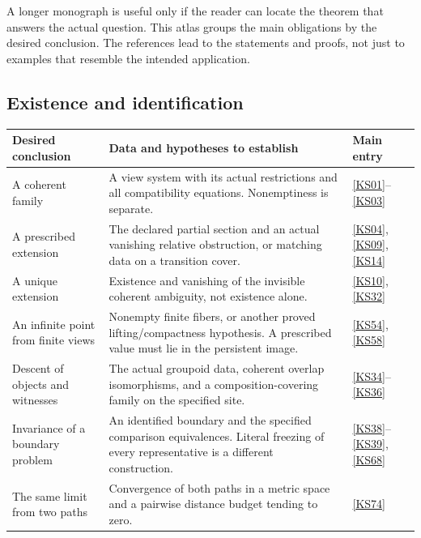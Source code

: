 \clearpage
{}\label{app:hypotheses}
A longer monograph is useful only if the reader can locate the theorem that answers the actual question. This atlas groups the main obligations by the desired conclusion. The references lead to the statements and proofs, not just to examples that resemble the intended application.

\subsection{Existence and identification}
\begin{longtable}{@{}p{.24\linewidth}p{.48\linewidth}p{.21\linewidth}@{}}
\toprule Desired conclusion & Data and hypotheses to establish & Main entry\\\midrule\endhead
A coherent family & A view system with its actual restrictions and all compatibility equations. Nonemptiness is separate. & \ref{KS01}--\ref{KS03}\\[4pt]
A prescribed extension & The declared partial section and an actual vanishing relative obstruction, or matching data on a transition cover. & \ref{KS04}, \ref{KS09}, \ref{KS14}\\[4pt]
A unique extension & Existence and vanishing of the invisible coherent ambiguity, not existence alone. & \ref{KS10}, \ref{KS32}\\[4pt]
An infinite point from finite views & Nonempty finite fibers, or another proved lifting/compactness hypothesis. A prescribed value must lie in the persistent image. & \ref{KS54}, \ref{KS58}\\[4pt]
Descent of objects and witnesses & The actual groupoid data, coherent overlap isomorphisms, and a composition-covering family on the specified site. & \ref{KS34}--\ref{KS36}\\[4pt]
Invariance of a boundary problem & An identified boundary and the specified comparison equivalences. Literal freezing of every representative is a different construction. & \ref{KS38}--\ref{KS39}, \ref{KS68}\\[4pt]
The same limit from two paths & Convergence of both paths in a metric space and a pairwise distance budget tending to zero. & \ref{KS74}\\
\bottomrule
\end{longtable}

